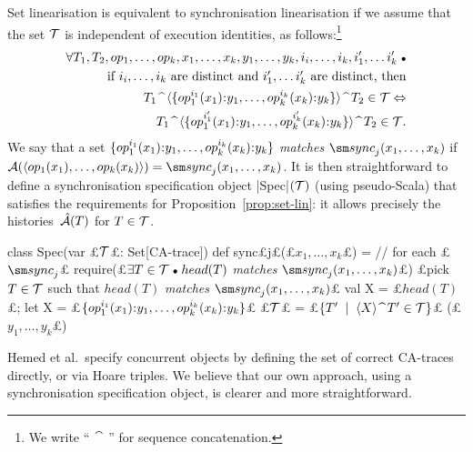 Set linearisation is equivalent to synchronisation linearisation if we assume
that the set $\mathcal{T}$ is independent of execution identities, as
follows:\footnote{We write ``$\,\cat\,$'' for sequence concatenation.}
\[
\begin{align}
\forall T_1, T_2, op_1, \ldots, op_k, x_1, \ldots, x_k, y_1, \ldots, y_k,
  i_i, \ldots, i_k, i_1', \ldots i_k' \spot \\
\quad \mbox{if $i_i, \ldots, i_k$ are distinct and $i_1', \ldots i_k'$ are
  distinct, then} \\
\qquad T_1 \cat \seq{\set{op_1^{i_1}(x_1)\::y_1,\ldots,op_k^{i_k}(x_k)\::y_k}} \cat T_2
  \in \T \Leftrightarrow \\
\qquad T_1 \cat \seq{\set{op_1^{i_1'}(x_1)\::y_1,\ldots,op_k^{i_k'}(x_k)\::y_k}} \cat T_2
  \in \T .
\end{align}
\]
We say that a set $\set{op_1^{i_1}(x_1)\::y_1,\ldots,op_k^{i_k}(x_k)\::y_k}$
\emph{matches} $\sync_j(x_1,\ldots,x_k)$ if
$\A(\seq{op_1(x_1),\ldots,op_k(x_k)}) = \sync_j(x_1,\ldots,x_k)$.
It is then straightforward to define a synchronisation specification object
|Spec|$(\mathcal{T})$ (using pseudo-Scala) that satisfies the requirements for
Proposition~\ref{prop:set-lin}: it allows precisely the histories~$\hat{\mathcal{A}}(T)$
for $T \in \mathcal{T}$. 
%
\begin{scala}
class Spec(var £$\mathcal{T}$£: Set[CA-trace]){
  def sync£\sub j£(£$x_1,\ldots,x_k$£) = { // for each £$\sync_j$£
    require(£$\exists T \in \mathcal{T} \mathrel{\scriptstyle\bullet} head(T)$ \emph{matches} $\sync_j(x_1,\ldots,x_k)$£)
    £pick $T \in \mathcal{T}$ such that $head(T)$ \emph{matches} $\sync_j(x_1,\ldots,x_k)$£
    val X = £$head(T)$£; let X = £$\set{op_1^{i_1}(x_1)\::y_1,\ldots,op_k^{i_k}(x_k)\::y_k}$£
    £$\mathcal{T}$£ = £$\{ T' \;\mid\; \langle X \rangle \mathbin{\widehat{\ }} T' \in \mathcal{T} \}$£
    (£$y_1,\ldots,y_k$£)
  }
}
\end{scala}


Hemed et al.\ specify concurrent objects by defining the set of correct
CA-traces directly, or via Hoare triples.  We believe that our own approach,
using a synchronisation specification object, is clearer and more
straightforward.



